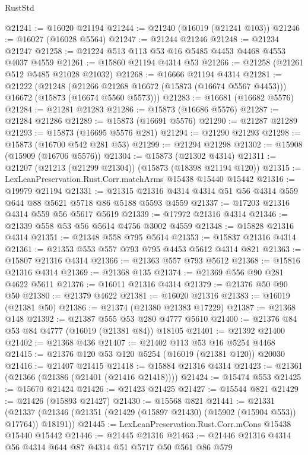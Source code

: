 \begin{lexlean}{RustStd}
\begin{coremodule}
@21241 := @16020 @21194
@21244 := @21240 (@16019 (@21241 @103))
@21246 := @16027 (@16028 @5564)
@21247 := @21244 @21246
@21248 := @21234 @21247
@21258 := @21224 @513 @113 @53 @16 @5485 @4453 @4468 @4553 @4037 @4559
@21261 := @15860 @21194 @4314 @53
@21266 := @21258 (@21261 @512 @5485 @21028 @21032)
@21268 := @16666 @21194 @4314
@21281 := @21222
    (@21248
      (@21266 @21268 @16672 (@15873 (@16674 @5567 @4453)))
      @16672
      (@15873 (@16674 @5560 @5573)))
@21283 := @16681 (@16682 @5576)
@21284 := @21281 @21283
@21286 := @15873 (@16686 @5576)
@21287 := @21284 @21286
@21289 := @15873 (@16691 @5576)
@21290 := @21287 @21289
@21293 := @15873 (@16695 @5576 @281)
@21294 := @21290 @21293
@21298 := @15873 (@16700 @542 @281 @53)
@21299 := @21294 @21298
@21302 := @15908 (@15909 (@16706 @5576))
@21304 := @15873 (@21302 @4314)
@21311 := @21207 (@21213 (@21299 @21304)) (@15873 (@18398 @21194 @120))
@21315 := LexLeanPreservation.Rust.Corr.matchArms @15438 @15440 @15442
@21316 := @19979 @21194
@21331 := @21315 @21316 @4314 @4314 @51 @56 @4314 @559 @644 @88 @5621 @5718 @86 @5188 @5593 @4559
@21337 := @17203 @21316 @4314 @559 @56 @5617 @5619
@21339 := @17972 @21316 @4314
@21346 := @21339 @558 @53 @56 @5614 @4756 @3002 @4559
@21348 := @15828 @21316 @4314
@21351 := @21348 @558 @795 @5614
@21353 := @15837 @21316 @4314
@21361 := @21353 @553 @557 @793 @795 @4453 @5612 @4314 @821
@21363 := @15807 @21316 @4314
@21366 := @21363 @557 @793 @5612
@21368 := @15816 @21316 @4314
@21369 := @21368 @135
@21374 := @21369 @556 @90 @281 @4622 @5611
@21376 := @16011 @21316 @4314
@21379 := @21376 @50 @90 @50
@21380 := @21379 @4622
@21381 := @16020 @21316
@21383 := @16019 (@21381 @50)
@21386 := @21374 (@21380 @21383 @17229)
@21387 := @21368 @148
@21392 := @21387 @555 @53 @280 @4777 @5610
@21400 := @21376 @84 @53 @84 @4777 (@16019 (@21381 @84)) @18105
@21401 := @21392 @21400
@21402 := @21368 @436
@21407 := @21402 @113 @53 @16 @5254 @4468
@21415 := @21376 @120 @53 @120 @5254 (@16019 (@21381 @120)) @20030
@21416 := @21407 @21415
@21418 := @15884 @21316 @4314
@21423 := @21361 (@21366 (@21386 (@21401 (@21416 @21418))))
@21424 := @15474 @553
@21425 := @15670 @21424
@21426 := @21423 @21425
@21427 := @15544 @821
@21429 := @21426 (@15893 @21427)
@21430 := @15568 @821
@21441 := @21331
    (@21337 (@21346 (@21351 (@21429 (@15897 @21430) (@15902 (@15904 @553)) @17764)) @18191))
@21445 := LexLeanPreservation.Rust.Corr.mCons @15438 @15440 @15442
@21446 := @21445 @21316
@21463 := @21446
    @21316
    @4314
    @56
    @4314
    @644
    @87
    @4314
    @51
    @5717
    @50
    @561
    @86
    @579

\end{coremodule}
\end{lexlean}
